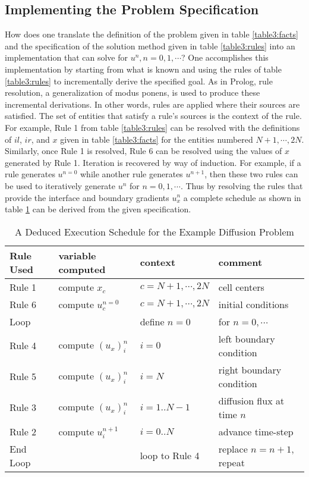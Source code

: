 \documentclass[10pt,epsf]{book}
\begin{document}
\subsection{Implementing the  Problem Specification}

How does one translate the definition of the problem given in table
\ref{table3:facts} and the specification of the solution method given
in table \ref{table3:rules} into an implementation that can solve for
$u^n, n=0,1, \cdots$?  One accomplishes this implementation by
starting from what is known and using the rules of table
\ref{table3:rules} to incrementally derive the specified goal.  As in
Prolog\cite{Clocksin.87}\cite{Sterling.86}, rule resolution, a
generalization of modus ponens, is used to produce these incremental
derivations.  In other words, rules are applied where their sources
are satisfied.  The set of entities that satisfy a rule's sources is
the context of the rule.  For example, Rule 1 from table
\ref{table3:rules} can be resolved with the definitions of $il$, $ir$,
and $x$ given in table \ref{table3:facts} for the entities numbered
$N+1, \cdots, 2N$.  Similarly, once Rule 1 is resolved, Rule 6 can be
resolved using the values of $x$ generated by Rule 1.  Iteration is
recovered by way of induction.  For example, if a rule generates
$u^{n=0}$ while another rule generates $u^{n+1}$, then these two rules
can be used to iteratively generate $u^n$ for $n=0,1, \cdots$.  Thus
by resolving the rules that provide the interface and boundary
gradients $u_x^n$ a complete schedule as shown in table
\ref{table3:schedule} can be derived from the given specification.

\begin{table}[htbp]
\caption{ A Deduced Execution Schedule for the Example
  Diffusion Problem}
\begin{center}
  \begin{tabular}{|l|l|l|l|}
    \hline
    Rule Used & variable computed  & context          & comment \\
    \hline
    Rule 1 & compute $x_c$         & $c=N+1, \cdots, 2N$ & cell centers\\
    Rule 6 & compute $u^{n=0}_c$   & $c=N+1, \cdots, 2N$ & initial conditions \\
    Loop   &                       & define $n=0$     & for $n=0,\cdots$ \\
    Rule 4 & compute $(u_x)^n_i$   & $i=0$       & left boundary condition\\
    Rule 5 & compute $(u_x)^n_i$   & $i=N$       & right boundary condition\\
    Rule 3 & compute $(u_x)^n_i$   & $i=1..N-1$  & diffusion flux at time $n$\\
    Rule 2 & compute $u^{n+1}_i$   & $i=0..N$    & advance time-step\\
    End Loop &                     & loop to Rule 4 & replace $n=n+1$, repeat\\
    \hline
  \end{tabular}
\end{center}
\label{table3:schedule}
\end{table}
\end{document}
